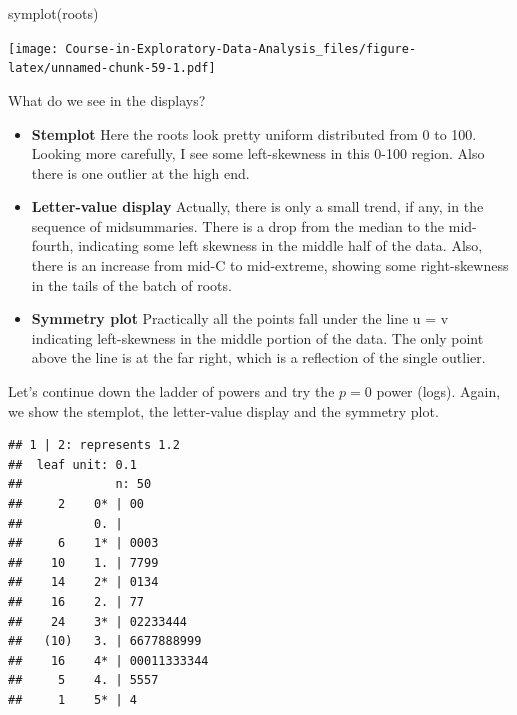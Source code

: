 \documentclass[
]{book}
\newenvironment{Shaded}{\begin{snugshade}}{\end{snugshade}}
\newcommand{\FunctionTok}[1]{\textcolor[rgb]{0.00,0.00,0.00}{#1}}
\newcommand{\NormalTok}[1]{#1}
\newcommand{\OtherTok}[1]{\textcolor[rgb]{0.56,0.35,0.01}{#1}}
\newcommand{\SpecialCharTok}[1]{\textcolor[rgb]{0.00,0.00,0.00}{#1}}
\providecommand{\tightlist}{%
  \setlength{\itemsep}{0pt}\setlength{\parskip}{0pt}}
\begin{document}
\begin{Shaded}
\begin{Highlighting}[]
\FunctionTok{symplot}\NormalTok{(roots)}
\end{Highlighting}
\end{Shaded}

\texttt{[image: Course-in-Exploratory-Data-Analysis\_files/figure-latex/unnamed-chunk-59-1.pdf]}

What do we see in the displays?

\begin{itemize}
\tightlist
\item
  \textbf{Stemplot} Here the roots look pretty uniform distributed from 0 to 100. Looking more carefully, I see some left-skewness in this 0-100 region. Also there is one outlier at the high end.
\item
  \textbf{Letter-value display} Actually, there is only a small trend, if any, in the sequence of midsummaries. There is a drop from the median to the mid-fourth, indicating some left skewness in the middle half of the data. Also, there is an increase from mid-C to mid-extreme, showing some right-skewness in the tails of the batch of roots.
\item
  \textbf{Symmetry plot} Practically all the points fall under the line u = v indicating left-skewness in the middle portion of the data. The only point above the line is at the far right, which is a reflection of the single outlier.
\end{itemize}

Let's continue down the ladder of powers and try the \(p = 0\) power (logs). Again, we show the stemplot, the letter-value display and the symmetry plot.

\begin{Shaded}
\end{Shaded}

\begin{verbatim}
## 1 | 2: represents 1.2
##  leaf unit: 0.1
##             n: 50
##     2    0* | 00
##          0. | 
##     6    1* | 0003
##    10    1. | 7799
##    14    2* | 0134
##    16    2. | 77
##    24    3* | 02233444
##   (10)   3. | 6677888999
##    16    4* | 00011333344
##     5    4. | 5557
##     1    5* | 4
\end{verbatim}
\end{document}
